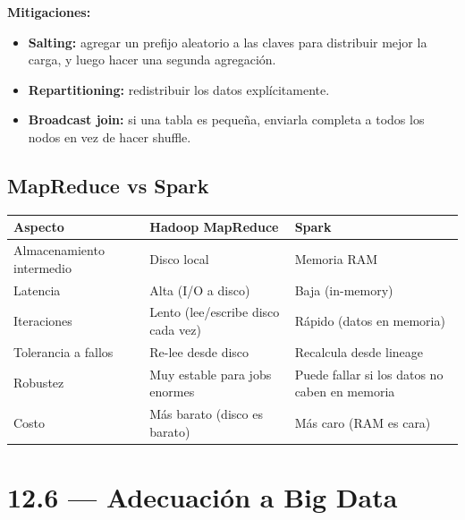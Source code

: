 \documentclass[11pt, a4paper]{article}
\begin{document}
\textbf{Mitigaciones:}
\begin{itemize}
	\item \textbf{Salting:} agregar un prefijo aleatorio a las claves para distribuir mejor la carga, y luego hacer una segunda agregación.
	\item \textbf{Repartitioning:} redistribuir los datos explícitamente.
	\item \textbf{Broadcast join:} si una tabla es pequeña, enviarla completa a todos los nodos en vez de hacer shuffle.
\end{itemize}

\subsection{MapReduce vs Spark}

\begin{center}
	\begin{tabular}{p{3.5cm} p{4.5cm} p{4.5cm}}
		\toprule
		\textbf{Aspecto}          & \textbf{Hadoop MapReduce}          & \textbf{Spark}                                \\
		\midrule
		Almacenamiento intermedio & Disco local                        & Memoria RAM                                   \\
		Latencia                  & Alta (I/O a disco)                 & Baja (in-memory)                              \\
		Iteraciones               & Lento (lee/escribe disco cada vez) & Rápido (datos en memoria)                     \\
		Tolerancia a fallos       & Re-lee desde disco                 & Recalcula desde lineage                       \\
		Robustez                  & Muy estable para jobs enormes      & Puede fallar si los datos no caben en memoria \\
		Costo                     & Más barato (disco es barato)       & Más caro (RAM es cara)                        \\
		\bottomrule
	\end{tabular}
\end{center}

\section{12.6 — Adecuación a Big Data}
\end{document}
